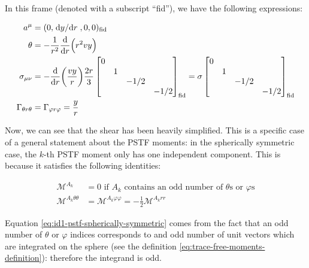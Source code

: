 \documentclass[main.tex]{subfiles}
\begin{document}
In this frame (denoted with a subscript ``fid''), we have the following expressions:

\begin{subequations} \label{eq:spherical-coordinates-simplifications}
\begin{align}
  a^\mu &= (0,\dv*{y}{r},0,0)_{\text{fid}} \\
  \theta &= - \frac{1}{r^2} \dv{}{r} \qty(r^2 v y)  \\
  \sigma_{\mu\nu} &= - \dv{}{r} \qty(\frac{vy}{r}) \frac{2r}{3} \begin{bmatrix}
  0   &   &   &  \\
     &  1 &   &  \\
     &   & -1/2  &  \\
     &   &   & -1/2
  \end{bmatrix} _{\text{fid}}
  = \sigma \begin{bmatrix}
  0   &   &   &  \\
     &  1 &   &  \\
     &   & -1/2  &  \\
     &   &   & -1/2
  \end{bmatrix} _{\text{fid}} \\
  \Gamma_{\theta r \theta} &= \Gamma_{\varphi r \varphi} = \frac{y}{r}
\end{align}
\end{subequations}

Now, we can see that the shear has been heavily simplified. This is a specific case of a general statement about the PSTF moments: in the spherically symmetric case, the \(k\)-th PSTF moment only has one independent component. This is because it satisfies the following identities:

\begin{subequations}
\begin{align}
  \mathscr M ^{A_k} &= 0 \text{ if } A_k \text{ contains an odd number of } \theta \text{s or } \varphi \text{s}  \label{eq:id1-pstf-spherically-symmetric}  \\
  \mathscr M ^{A_k \theta \theta} &= \mathscr M ^{A_k \varphi \varphi} = -\frac{1}{2} \mathscr M ^{A_k rr} \label{eq:id2-pstf-spherically-symmetric}
\end{align}
\end{subequations}

Equation \eqref{eq:id1-pstf-spherically-symmetric}  comes from the fact that an odd number of \(\theta\) or \(\varphi\) indices corresponds to and odd number of unit vectors which are integrated on the sphere (see the definition \eqref{eq:trace-free-moments-definition}): therefore the integrand is odd.
\end{document}
